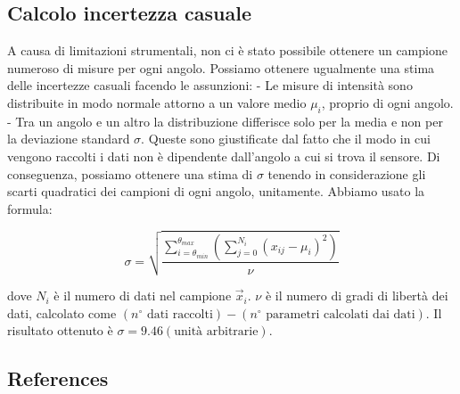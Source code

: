 \documentclass[12pt, a4paper, twoside]{article}
\begin{document}
  \subsection{Calcolo incertezza casuale}\label{subsec:calcolo-incertezza-casuale}
    A causa di limitazioni strumentali, non ci è stato possibile ottenere un campione
    numeroso di misure per ogni angolo. Possiamo ottenere ugualmente
    una stima delle incertezze casuali facendo le assunzioni: %
    - Le misure di intensità sono distribuite in modo normale attorno a un valore
      medio $\mu_i$, proprio di ogni angolo.
    - Tra un angolo e un altro la distribuzione differisce solo per la media e non per la
      deviazione standard $\sigma$.
    Queste sono giustificate dal fatto che il modo in cui vengono raccolti i dati
    non è dipendente dall'angolo a cui si trova il sensore.
    Di conseguenza, possiamo ottenere una stima di $\sigma$ tenendo in considerazione
    gli scarti quadratici dei campioni di ogni angolo, unitamente.
    Abbiamo usato la formula:

    \begin{equation}
      \sigma = \sqrt{
        \frac {
          \sum_{i = \theta_{min}}^{\theta_{max}} \left(
            \sum_{j = 0}^{N_i} (x_{ij} -\mu_i)^2
          \right)
        } {
          \nu
        }
      }
    \end{equation}

    \noindent dove $N_i$ è il numero di dati nel campione $\vec{x}_i$.
    $\nu$ è il numero di gradi di libertà dei dati, calcolato come
    $(n^\circ \text{ dati raccolti}) - (n^\circ \text{ parametri calcolati dai dati})$.
    Il risultato ottenuto è $\sigma = 9.46 (\text{unità arbitrarie})$.  %
    \cite{mazzoldi98}
  \subsection{References}
\end{document}
